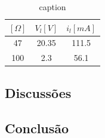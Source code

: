 \documentclass[12pt,a4paper]{article}
\begin{document}
\begin{table}[htpb]
  \centering
  \caption{caption}
  \label{tab:label}
  \begin{tabular}{c c c }
    \toprule
    $[\Omega]$ & $V_{l} [V]$&$i_l [mA]$  \\ \midrule
   47& 20.35& 111.5 \\\midrule
   100& 2.3& 56.1 \\\midrule
  \end{tabular}
\end{table}

\newpage
\subsection{Discussões}
\newpage
\subsection{Conclusão} 
\end{document}
